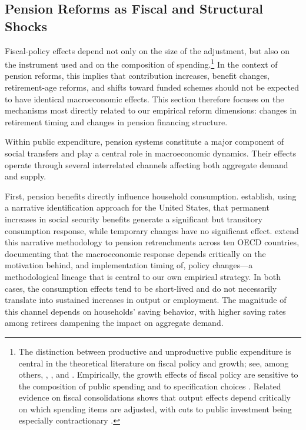 \documentclass[11pt,english,a4paper, twoside, authoryear]{article}
\begin{document}
\subsection{Pension Reforms as Fiscal and Structural Shocks}



Fiscal-policy effects depend not only on the size of the adjustment, but also on the instrument used and on the composition of spending.\footnote{The distinction between productive and unproductive public expenditure is central in the theoretical literature on fiscal policy and growth; see, among others, \citet{Barro1990}, \citet{Devarajan1996}, and \citet{Sardoni2024}. Empirically, the growth effects of fiscal policy are sensitive to the composition of public spending and to specification choices \citep{MoralBenito2012, Gemmell2016}. Related evidence on fiscal consolidations shows that output effects depend critically on which spending items are adjusted, with cuts to public investment being especially contractionary \citep{Ardanaz2021}.} In the context of pension reforms, this implies that contribution increases, benefit changes, retirement-age reforms, and shifts toward funded schemes should not be expected to have identical macroeconomic effects. This section therefore focuses on the mechanisms most directly related to our empirical reform dimensions: changes in retirement timing and changes in pension financing structure.



Within public expenditure, pension systems constitute a major component of social transfers and play a central role in macroeconomic dynamics. Their effects operate through several interrelated channels affecting both aggregate demand and supply.

First, pension benefits directly influence household consumption. \citet{RomerRomer2016} establish, using a narrative identification approach for the United States, that permanent increases in social security benefits generate a significant but transitory consumption response, while temporary changes have no significant effect. \citet{BiZubairy2023} extend this narrative methodology to pension retrenchments across ten OECD countries, documenting that the macroeconomic response depends critically on the motivation behind, and implementation timing of, policy changes---a methodological lineage that is central to our own empirical strategy. In both cases, the consumption effects tend to be short-lived and do not necessarily translate into sustained increases in output or employment. The magnitude of this channel depends on households' saving behavior, with higher saving rates among retirees dampening the impact on aggregate demand.
\end{document}
